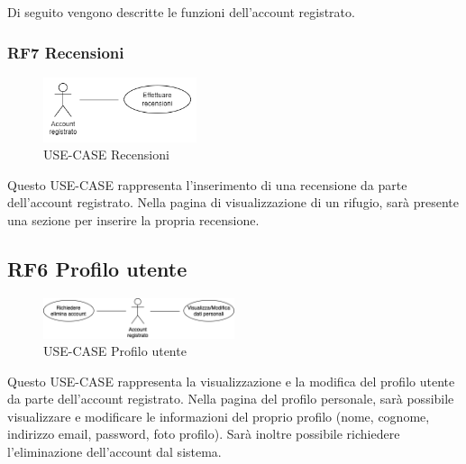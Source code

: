 \documentclass[a4paper,12pt]{article}
\begin{document}
Di seguito vengono descritte le funzioni dell'account registrato.

\subsubsection*{RF7 Recensioni}
\begin{figure}[H]
   \centering
   \includegraphics[width=0.4\textwidth]{img-D2/recensioni_registrato.png}
    \caption{USE-CASE Recensioni}
\end{figure}

Questo USE-CASE rappresenta l'inserimento di una recensione da parte dell'account registrato.
Nella pagina di visualizzazione di un rifugio, sarà presente una sezione per inserire la propria recensione.
 
\subsection*{RF6 Profilo utente}
\begin{figure}[H]
   \centering   \includegraphics[width=0.5\textwidth]{img-D2/profilo_utente.png}
    \caption{USE-CASE Profilo utente}
\end{figure}

Questo USE-CASE rappresenta la visualizzazione e la modifica del profilo utente da parte dell'account registrato.
Nella pagina del profilo personale, sarà possibile visualizzare e modificare le informazioni del proprio profilo (nome, cognome, indirizzo email, password, foto profilo).
Sarà inoltre possibile richiedere l'eliminazione dell'account dal sistema. 
\end{document}
